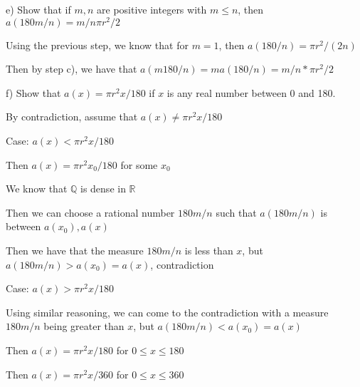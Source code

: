 \documentclass[11pt]{article}
\begin{document}
\begin{itemize}
		e) Show that if $m,n$ are positive integers with $m \leq n$, then $a(180 m/n) = m/n \pi r^2 / 2$

		Using the previous step, we know that for $m=1$, then $a(180/n) = \pi r^2 / (2n)$

		Then by step c), we have that $a(m 180/n) = ma(180/n) = m/n * \pi r^2 / 2$

		f) Show that $a(x) = \pi r^2 x/180$ if $x$ is any real number between 0 and 180.

		By contradiction, assume that $a(x) \neq \pi r^2 x/180$

		Case: $a(x) < \pi r^2 x/180$

		Then $a(x) = \pi r^2 x_0/180$ for some $x_0$ 

		We know that $\mathbb{Q}$ is dense in $\mathbb{R}$

		Then we can choose a rational number $180 m/n$ such that $a(180 m/n)$ is between $a(x_0), a(x)$

		Then we have that the measure $180 m/n$ is less than $x$, but $a(180 m/n) > a(x_0) = a(x)$, contradiction

		Case: $a(x) > \pi r^2 x/180$

		Using similar reasoning, we can come to the contradiction with a measure $180 m/n$ being greater than $x$, but $a(180 m/n) < a(x_0) = a(x)$

		Then $a(x) = \pi r^2 x/180$ for $0 \leq  x \leq 180$

		Then $a(x) = \pi r^2 x/360$ for $0 \leq x \leq 360$


\end{itemize}
\end{document}
